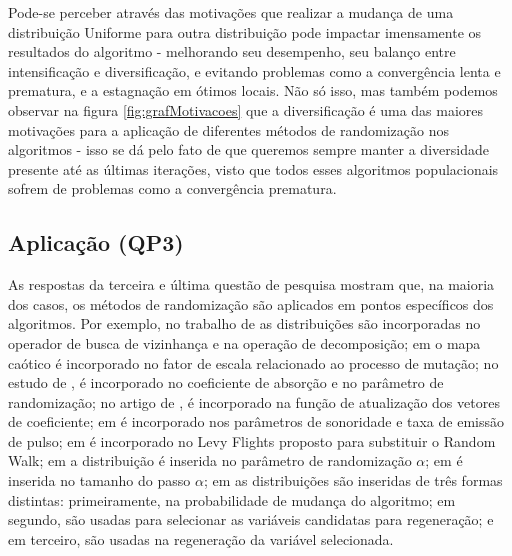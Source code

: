 Pode-se perceber através das motivações que realizar a mudança de uma distribuição Uniforme para outra distribuição pode impactar imensamente os resultados do algoritmo - melhorando seu desempenho, seu balanço entre intensificação e diversificação, e evitando problemas como a convergência lenta e prematura, e a estagnação em ótimos locais. Não só isso, mas também podemos observar na figura \ref{fig:grafMotivacoes} que a diversificação é uma das maiores motivações para a aplicação de diferentes métodos de randomização nos algoritmos - isso se dá pelo fato de que queremos sempre manter a diversidade presente até as últimas iterações, visto que todos esses algoritmos populacionais sofrem de problemas como a convergência prematura.


\subsection{Aplicação (QP3)}

As respostas da terceira e última questão de pesquisa mostram que, na maioria dos casos, os métodos de randomização são aplicados em pontos específicos dos algoritmos. Por exemplo, no trabalho de \cite{yu} as distribuições são incorporadas no operador de busca de vizinhança e na operação de decomposição; em \cite{alireza} o mapa caótico é incorporado no fator de escala relacionado ao processo de mutação; no estudo de \cite{coelho}, é incorporado no coeficiente de absorção e no parâmetro de randomização; no artigo de \cite{farshin}, é incorporado na função de atualização dos vetores de coeficiente; em \cite{liang} é incorporado nos parâmetros de sonoridade e taxa de emissão de pulso; em \cite{lin} é incorporado no Levy Flights proposto para substituir o Random Walk; em \cite{coelho2} a distribuição é inserida no parâmetro de randomização $\alpha$; em \cite{wang} é inserida no tamanho do passo $\alpha$; em \cite{kaveh} as distribuições são inseridas de três formas distintas: primeiramente, na probabilidade de mudança do algoritmo; em segundo, são usadas para selecionar as variáveis candidatas para regeneração; e em terceiro, são usadas na regeneração da variável selecionada. 


